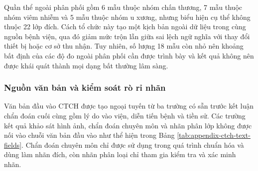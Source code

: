 Quần thể ngoài phân phối gồm 6 mẫu thuộc nhóm chấn thương, 7 mẫu thuộc nhóm viêm nhiễm và 5 mẫu thuộc nhóm u xương, nhưng biểu hiện cụ thể không thuộc 22 lớp đích. Cách tổ chức này tạo một kịch bản ngoài dữ liệu trong cùng nguồn bệnh viện, qua đó giảm mức trộn lẫn giữa sai lệch ngữ nghĩa với thay đổi thiết bị hoặc cơ sở thu nhận. Tuy nhiên, số lượng 18 mẫu còn nhỏ nên khoảng bất định của các độ đo ngoài phân phối cần được trình bày và kết quả không nên được khái quát thành mọi dạng bất thường lâm sàng.


\subsubsection{Nguồn văn bản và kiểm soát rò rỉ nhãn}

Văn bản đầu vào CTCH được tạo ngoại tuyến từ ba trường có sẵn trước kết luận chẩn đoán cuối cùng gồm lý do vào viện, diễn tiến bệnh và tiền sử. Các trường kết quả khảo sát hình ảnh, chẩn đoán chuyên môn và nhãn phân lớp không được nối vào chuỗi văn bản đầu vào như thể hiện trong Bảng \ref{tab:appendix-ctch-text-fields}. Chẩn đoán chuyên môn chỉ được sử dụng trong quá trình chuẩn hóa và dùng làm nhãn đích, còn nhãn phân loại chỉ tham gia kiểm tra và xác minh nhãn.

\begin{table}[H]
\centering
\small
{}
\caption{Vai trò của các trường bệnh án CTCH và nguyên tắc loại thông tin có nguy cơ rò rỉ nhãn}
\label{tab:appendix-ctch-text-fields}
\end{table}

